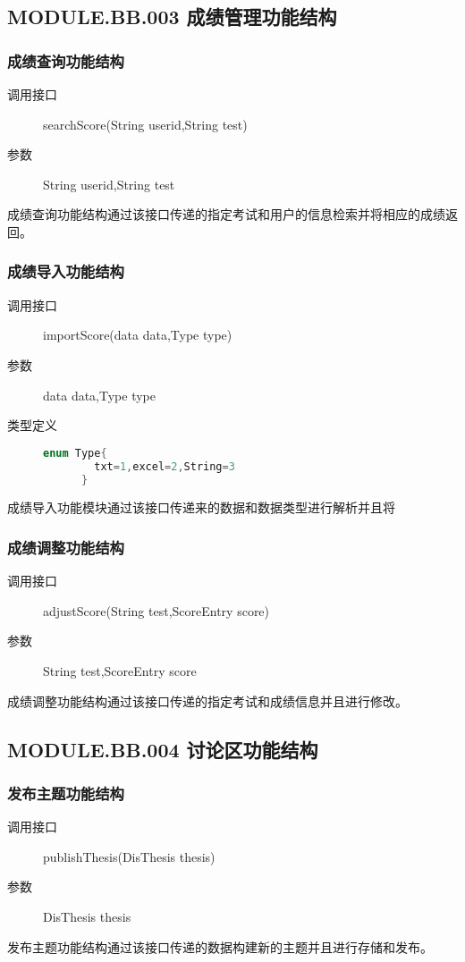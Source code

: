 \subsection{MODULE.BB.003 成绩管理功能结构}
  \subsubsection{成绩查询功能结构}
  \begin{description}
    \item[调用接口]searchScore(String userid,String test)
    \item[参数]String userid,String test
  \end{description}
  成绩查询功能结构通过该接口传递的指定考试和用户的信息检索并将相应的成绩返回。
  \subsubsection{成绩导入功能结构}
  \begin{description}
    \item[调用接口]importScore(data data,Type type)
    \item[参数]data data,Type type
    \item[类型定义]
    \begin{lstlisting}[language=C]
      enum Type{
        txt=1,excel=2,String=3
      }
    \end{lstlisting}
  \end{description}
  成绩导入功能模块通过该接口传递来的数据和数据类型进行解析并且将
  \subsubsection{成绩调整功能结构}
  \begin{description}
    \item[调用接口]adjustScore(String test,ScoreEntry score)
    \item[参数]String test,ScoreEntry score
  \end{description}
  成绩调整功能结构通过该接口传递的指定考试和成绩信息并且进行修改。

\subsection{MODULE.BB.004 讨论区功能结构}
  \subsubsection{发布主题功能结构}
  \begin{description}
    \item[调用接口]publishThesis(DisThesis thesis)
    \item[参数]DisThesis thesis
  \end{description}
  发布主题功能结构通过该接口传递的数据构建新的主题并且进行存储和发布。
